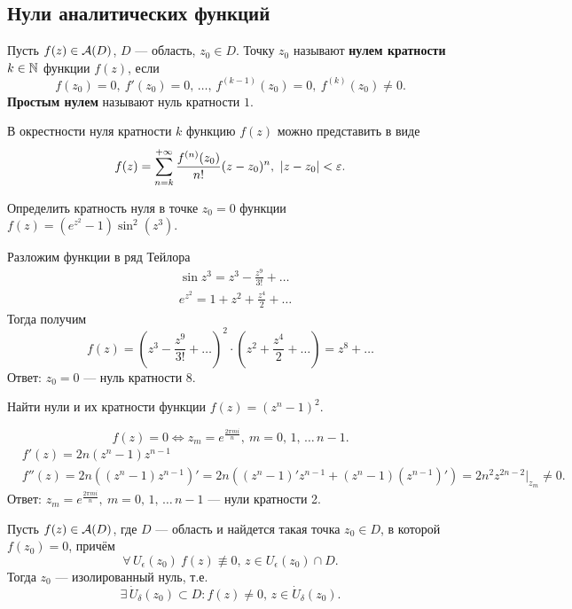 	\subsection{Нули аналитических функций}
	\begin{definition}
		Пусть $f(z)\in\mathcal{A}(D)$, $D$ --- область, $z_0\in D$. Точку $z_0$ называют \textbf{нулем кратности $k\in\mathbb{N}$} функции $f(z)$, если
		\[ f(z_0) = 0,\ f'(z_0) = 0,\,\dots,\, f^{(k-1)}(z_0) = 0,\ f^{(k)}(z_0)\ne0. \]
		\textbf{Простым нулем} называют нуль кратности $1$.
	\end{definition}
	\begin{remark}
		В окрестности нуля кратности $k$ функцию $f(z)$ можно представить в виде
		\[ f(z) = \Sum_{n=k}^{+\infty}\frac{f^{(n)}(z_0)}{n!}(z-z_0)^n,\ |z-z_0|<\epsilon. \]
	\end{remark}
	\newpage
	\begin{example}
		Определить кратность нуля в точке $z_0 = 0$ функции $f(z) = \left(e^{z^2}-1 \right) \sin^2(z^3)$.
	\end{example}
	\noindent
	Разложим функции в ряд Тейлора 
	\begin{align*}
		&\sin z^3 = z^3-\frac{z^9}{3!}+\ldots\\
		&e^{z^2} = 1 + z^2 + \frac{z^4}{2}+ \ldots
	\end{align*}
	Тогда получим
	\[ f(z) = \left( z^3-\frac{z^9}{3!}+\ldots\right)^2\cdot\left( z^2 + \frac{z^4}{2}+ \ldots\right) = z^8 + \ldots \]
	Ответ: $z_0 = 0 $ --- нуль кратности 8.
	\begin{example}
		Найти нули и их кратности функции $f(z) = (z^n-1)^2$.
	\end{example}
	\[ f(z) = 0\iff z_m = e^\frac{2\pi mi}{n},\ m = 0,\,1,\,\ldots\,n-1. \]
	\begin{align*}
		&f'(z) = 2n(z^n-1)z^{n-1}\\
		&f''(z) = 2n\left((z^n-1)z^{n-1}\right)' = 2n\left((z^n-1)'z^{n-1} + (z^n-1)(z^{n-1})'\right) = 2n^2z^{2n-2}\Big|_{z_m}\ne 0.
	\end{align*}
	Ответ: $z_m=e^\frac{2\pi mi}{n},\ m = 0,\,1,\,\ldots\,n-1$ --- нули кратности 2.
	\begin{theorem}
		Пусть $f(z)\in\mathcal{A}(D)$, где $D$ --- область и найдется такая точка $z_0\in D$, в которой $f(z_0)=0$, причём
		\[\forall\,U_\epsilon(z_0)\ f(z)\not\equiv0,\, z\in U_\epsilon(z_0)\cap D. \]
		Тогда $z_0$ --- изолированный нуль, т.е.
		\[ \exists\,\dot U_\delta(z_0)\subset D : f(z)\ne 0,\, z\in\dot  U_\delta(z_0). \]
	\end{theorem}

